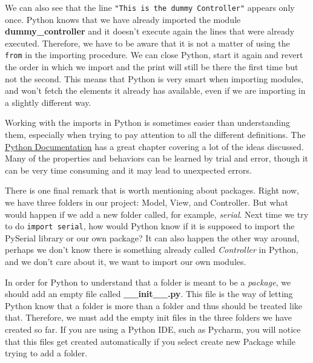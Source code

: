 We can also see that the line \texttt{"This is the dummy Controller"} appears only once. Python knows that we have already imported the module \textbf{dummy\_controller} and it doesn't execute again the lines that were already executed. Therefore, we have to be aware that it is not a matter of using the \texttt{from} in the importing procedure. We can close Python, start it again and revert the order in which we import and the print will still be there the first time but not the second. This means that Python is very smart when importing modules, and won't fetch the elements it already has available, even if we are importing in a slightly different way.


Working with the imports in Python is sometimes easier than understanding them, especially when trying to pay attention to all the different definitions. The \href{https://docs.python.org/3.6/tutorial/modules.html}{Python Documentation} has a great chapter covering a lot of the ideas discussed. Many of the properties and behaviors can be learned by trial and error, though it can be very time consuming and it may lead to unexpected errors.

There is one final remark that is worth mentioning about packages. Right now, we have three folders in our project: Model, View, and Controller. But what would happen if we add a new folder called, for example, \emph{serial}. Next time we try to do \texttt{import serial}, how would Python know if it is supposed to import the PySerial library or our own package? It can also happen the other way around, perhaps we don't know there is something already called \emph{Controller} in Python, and we don't care about it, we want to import our own modules.

In order for Python to understand that a folder is meant to be a \emph{package}, we should add an empty file called \textbf{\_\_init\_\_.py}. This file is the way of letting Python know that a folder is more than a folder and thus should be treated like that. Therefore, we must add the empty init files in the three folders we have created so far. If you are using a Python IDE, such as Pycharm, you will notice that this files get created automatically if you select create new Package while trying to add a folder.

